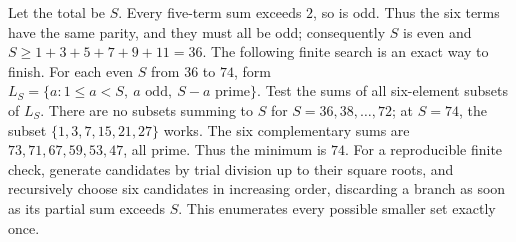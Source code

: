 Let the total be $S$. Every five-term sum exceeds $2$, so is odd. Thus the six terms have the same parity, and they must all be odd; consequently $S$ is even and $S\ge1+3+5+7+9+11=36$. The following finite search is an exact way to finish. For each even $S$ from $36$ to $74$, form $L_S=\{a:1\le a<S,\ a\text{ odd},\ S-a\text{ prime}\}$. Test the sums of all six-element subsets of $L_S$. There are no subsets summing to $S$ for $S=36,38,\ldots,72$; at $S=74$, the subset $\{1,3,7,15,21,27\}$ works. The six complementary sums are $73,71,67,59,53,47$, all prime. Thus the minimum is $\boxed{74}$. For a reproducible finite check, generate candidates by trial division up to their square roots, and recursively choose six candidates in increasing order, discarding a branch as soon as its partial sum exceeds $S$. This enumerates every possible smaller set exactly once.
